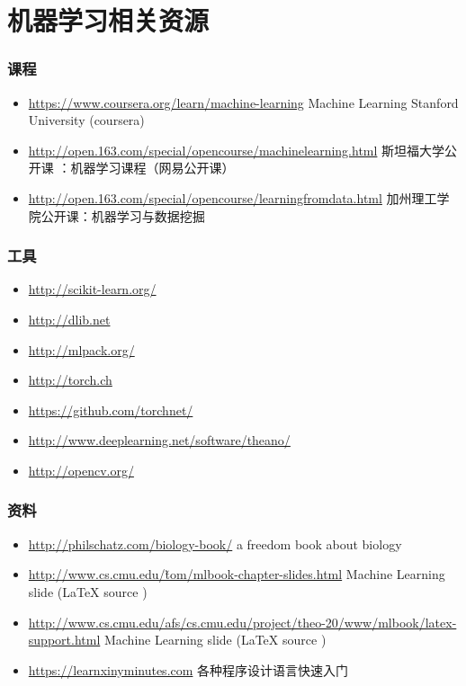 \documentclass{beamer}
\begin{document}
\section{机器学习相关资源}
\label{sec-6}
\begin{frame}
\frametitle{课程}
\label{sec-6-1}


\begin{itemize}
\item \href{https://www.coursera.org/learn/machine-learning}{https://www.coursera.org/learn/machine-learning}  Machine Learning Stanford University (coursera)
\item \href{http://open.163.com/special/opencourse/machinelearning.html}{http://open.163.com/special/opencourse/machinelearning.html}  斯坦福大学公开课 ：机器学习课程（网易公开课）
\item \href{http://open.163.com/special/opencourse/learningfromdata.html}{http://open.163.com/special/opencourse/learningfromdata.html} 加州理工学院公开课：机器学习与数据挖掘
\end{itemize}
\end{frame}
\begin{frame}
\frametitle{工具}
\label{sec-6-2}


\begin{itemize}
\item \href{http://scikit-learn.org/}{http://scikit-learn.org/}
\item \href{http://dlib.net}{http://dlib.net}
\item \href{http://mlpack.org/}{http://mlpack.org/}
\item \href{http://torch.ch}{http://torch.ch}
\item \href{https://github.com/torchnet/}{https://github.com/torchnet/}
\item \href{http://www.deeplearning.net/software/theano/}{http://www.deeplearning.net/software/theano/}
\item \href{http://opencv.org/}{http://opencv.org/}
\end{itemize}
\end{frame}
\begin{frame}
\frametitle{资料}
\label{sec-6-3}


\begin{itemize}
\item \href{http://philschatz.com/biology-book/}{http://philschatz.com/biology-book/}  a  freedom book about biology
\item \href{http://www.cs.cmu.edu/~tom/mlbook-chapter-slides.html}{http://www.cs.cmu.edu/\~tom/mlbook-chapter-slides.html}   Machine Learning slide (\LaTeX{} source )
\item \href{http://www.cs.cmu.edu/afs/cs.cmu.edu/project/theo-20/www/mlbook/latex-support.html}{http://www.cs.cmu.edu/afs/cs.cmu.edu/project/theo-20/www/mlbook/latex-support.html} Machine Learning slide (\LaTeX{} source )
\item \href{https://learnxinyminutes.com}{https://learnxinyminutes.com} 各种程序设计语言快速入门
\end{itemize}
\end{frame}
\end{document}
